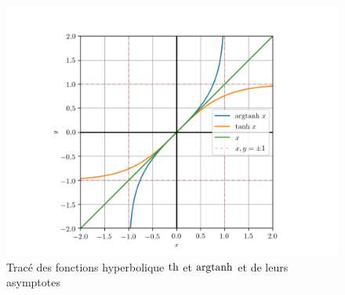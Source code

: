 %
\begin{figure}
  \centering
  \includegraphics[scale=0.7]{argtanh.png}
  \caption{Tracé des fonctions hyperbolique \(\operatorname{th}\) et \(\operatorname{argtanh}\) et de leurs asymptotes}
  \label{fig:tracetanhargth}
\end{figure}
\cleardoublepage
